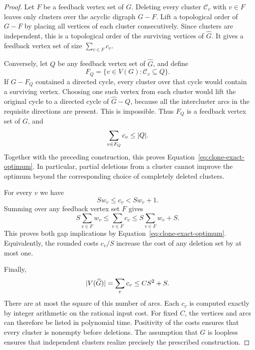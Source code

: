 \begin{proof}
Let $F$ be a feedback vertex set of $G$.  Deleting every cluster
$\mathcal C_v$ with $v\in F$ leaves only clusters over the acyclic digraph
$G-F$.  Lift a topological order of $G-F$ by placing all vertices of each
cluster consecutively.  Since clusters are independent, this is a
topological order of the surviving vertices of $\widehat G$.  It gives a
feedback vertex set of size $\sum_{v\in F}c_v$.

Conversely, let $Q$ be any feedback vertex set of $\widehat G$, and define
\[
  F_Q=\{v\in V(G):\mathcal C_v\subseteq Q\}.
\]
If $G-F_Q$ contained a directed cycle, every cluster over that cycle would
contain a surviving vertex.  Choosing one such vertex from each cluster
would lift the original cycle to a directed cycle of $\widehat G-Q$,
because all the intercluster arcs in the requisite directions are present.
This is impossible.  Thus $F_Q$ is a feedback vertex set of $G$, and
\[
  \sum_{v\in F_Q}c_v\le\lvert Q\rvert.
\]
Together with the preceding construction, this proves
Equation~\eqref{eq:clone-exact-optimum}.  In particular, partial deletions
from a cluster cannot improve the optimum beyond the corresponding
choice of completely deleted clusters.

For every $v$ we have
\[
  Sw_v\le c_v<Sw_v+1.
\]
Summing over any feedback vertex set $F$ gives
\[
  S\sum_{v\in F}w_v
  \le\sum_{v\in F}c_v
  \le S\sum_{v\in F}w_v+S.
\]
This proves both gap implications by
Equation~\eqref{eq:clone-exact-optimum}.  Equivalently, the rounded costs
$c_v/S$ increase the cost of any deletion set by at most one.

Finally,
\[
  \lvert V(\widehat G)\rvert=\sum_vc_v\le CS^2+S.
\]
There are at most the square of this number of arcs.  Each $c_v$ is
computed exactly by integer arithmetic on the rational input cost.
For fixed $C$, the vertices and arcs can therefore be listed in
polynomial time.  Positivity of the costs ensures that every cluster is
nonempty before deletions.  The assumption that $G$ is loopless ensures
that independent clusters realize precisely the prescribed construction.
\end{proof}

